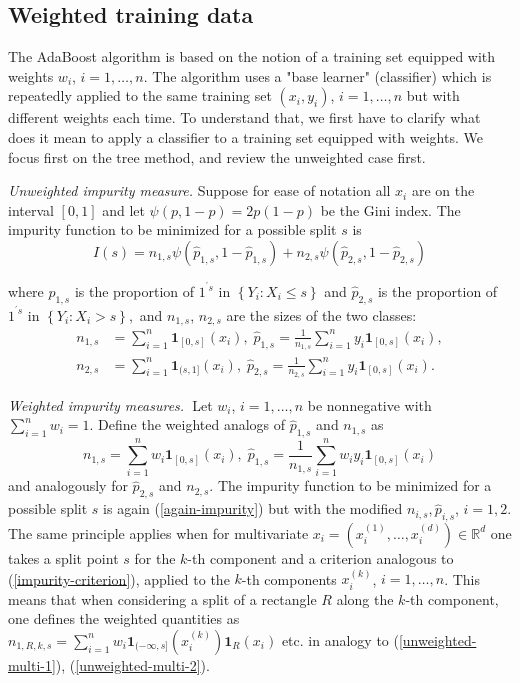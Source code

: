 \documentclass[11pt,twoside]{article}%
\theoremstyle{change}
\begin{document}
\subsection{Weighted training data}

The AdaBoost algorithm is based on the notion of a training set equipped with
weights $w_{i}$, $i=1,\ldots,n.$ The algorithm uses a "base learner"
(classifier) which is repeatedly applied to the same training set
$(x_{i},y_{i})$, $i=1,\ldots,n$ but with different weights each time. To
understand that, we first have to clarify what does it mean to apply a
classifier to a training set equipped with weights. We focus first on the tree
method, and review the unweighted case first.

\textit{Unweighted impurity measure. }Suppose for ease of notation all $x_{i}
$ are on the interval $[0,1]$ and let $\psi(p,1-p)=2p(1-p)$ be the Gini index.
The impurity function to be minimized for a possible split $s$ is
\begin{equation}
I(s)=n_{1,s}\psi\left(  \hat{p}_{1,s},1-\hat{p}_{1,s}\right)  +n_{2,s}%
\psi\left(  \hat{p}_{2,s},1-\hat{p}_{2,s}\right) \label{again-impurity}%
\end{equation}


where $\hat{p}_{1,s}$ is the proportion of $1^{^{\prime}s}$ in $\left\{
Y_{i}:X_{i}\leq s\right\}  $ and $\hat{p}_{2,s}$ is the proportion of
$1^{^{\prime}s}$ in $\left\{  Y_{i}:X_{i}>s\right\}  ,$ and $n_{1,s}$,
$n_{2,s} $ are the sizes of the two classes:
\begin{align*}
n_{1,s}  & =\sum_{i=1}^{n}\mathbf{1}_{[0,s]}(x_{i}),\;\hat{p}_{1,s}=\frac
{1}{n_{1,s}}\sum_{i=1}^{n}y_{i}\mathbf{1}_{[0,s]}(x_{i}),\\
n_{2,s}  & =\sum_{i=1}^{n}\mathbf{1}_{(s,1]}(x_{i}),\;\hat{p}_{2,s}=\frac
{1}{n_{2,s}}\sum_{i=1}^{n}y_{i}\mathbf{1}_{[0,s]}(x_{i}).
\end{align*}


\textit{Weighted impurity measures.}\textbf{\ }Let $w_{i}$, $i=1,\ldots,n$ be
nonnegative with $\sum_{i=1}^{n}w_{i}=1$. Define the weighted analogs of
$\hat{p}_{1,s}$ and $n_{1,s}$ as
\[
n_{1,s}=\sum_{i=1}^{n}w_{i}\mathbf{1}_{[0,s]}(x_{i}),\;\hat{p}_{1,s}=\frac
{1}{n_{1,s}}\sum_{i=1}^{n}w_{i}y_{i}\mathbf{1}_{[0,s]}(x_{i})
\]
and analogously for $\hat{p}_{2,s}$ and $n_{2,s}$. The impurity function to be
minimized for a possible split $s$ is again (\ref{again-impurity}) but with
the modified $n_{i,s},\hat{p}_{i,s}$, $i=1,2$. The same principle applies when
for multivariate $x_{i}=(x_{i}^{(1)},\ldots,x_{i}^{(d)})\in\mathbb{R}^{d}$ one
takes a split point $s$ for the $k$-th component and a criterion analogous to
(\ref{impurity-criterion}), applied to the $k$-th components $x_{i}^{(k)}$,
$i=1,\ldots,n$. This means that when considering a split of a rectangle $R$
along the $k$-th component, one defines the weighted quantities as
$n_{1,R,k,s}=\sum_{i=1}^{n}w_{i}\mathbf{1}_{(-\infty,s]}(x_{i}^{(k)}%
)\mathbf{1}_{R}(x_{i})$ etc. in analogy to (\ref{unweighted-multi-1}),
(\ref{unweighted-multi-2}).
\end{document}
